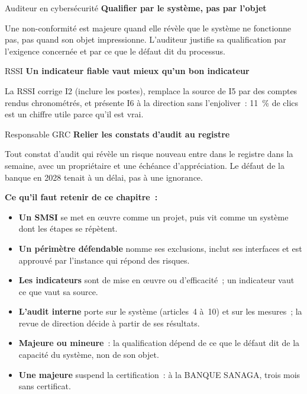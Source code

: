 \begin{boxmetier}{Auditeur en cybersécurité}
\textbf{Qualifier par le système, pas par l'objet}

Une non-conformité est majeure quand elle révèle que le système ne
fonctionne pas, pas quand son objet impressionne. L'auditeur justifie sa
qualification par l'exigence concernée et par ce que le défaut dit du
processus.
\end{boxmetier}

\begin{boxmetier}{RSSI}
\textbf{Un indicateur fiable vaut mieux qu'un bon indicateur}

La RSSI corrige I2 (inclure les postes), remplace la source de I5 par des
comptes rendus chronométrés, et présente I6 à la direction sans
l'enjoliver~: 11~\% de clics est un chiffre utile parce qu'il est vrai.
\end{boxmetier}

\begin{boxmetier}{Responsable GRC}
\textbf{Relier les constats d'audit au registre}

Tout constat d'audit qui révèle un risque nouveau entre dans le registre
dans la semaine, avec un propriétaire et une échéance d'appréciation. Le
défaut de la banque en 2028 tenait à un délai, pas à une ignorance.
\end{boxmetier}

\separateur

\begin{boxresume}
\textbf{Ce qu'il faut retenir de ce chapitre~:}
\begin{itemize}
    \item \textbf{Un SMSI} se met en œuvre comme un projet, puis vit comme
          un système dont les étapes se répètent.
    \item \textbf{Un périmètre défendable} nomme ses exclusions, inclut ses
          interfaces et est approuvé par l'instance qui répond des risques.
    \item \textbf{Les indicateurs} sont de mise en œuvre ou d'efficacité~;
          un indicateur vaut ce que vaut sa source.
    \item \textbf{L'audit interne} porte sur le système (articles~4 à~10) et
          sur les mesures~; la revue de direction décide à partir de ses
          résultats.
    \item \textbf{Majeure ou mineure}~: la qualification dépend de ce que
          le défaut dit de la capacité du système, non de son objet.
    \item \textbf{Une majeure} suspend la certification~: à la BANQUE
          SANAGA, trois mois sans certificat.
\end{itemize}
\end{boxresume}

